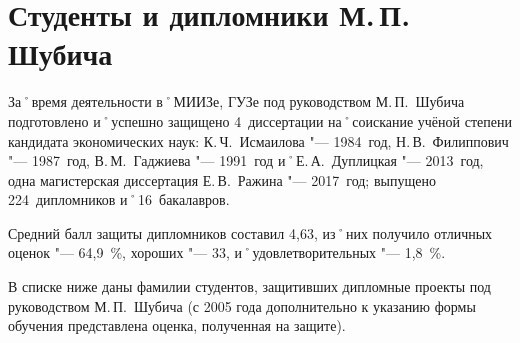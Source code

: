 ﻿\section{Студенты и дипломники М.\,П. Шубича}
За˚время деятельности в˚МИИЗе, ГУЗе под руководством М.\,П.~Шубича подготовлено и˚успешно защищено 4~диссертации на˚соискание учёной степени кандидата экономических наук: К.\,Ч.~Исмаилова "--- 1984~год, Н.\,В.~Филиппович "--- 1987~год, В.\,М.~Гаджиева "--- 1991~год и˚Е.\,А.~Дуплицкая "--- 2013~год, одна магистерская диссертация Е.\,В.~Ражина "--- 2017~год; выпущено 224~дипломников и˚16~бакалавров.

Средний балл защиты дипломников составил 4,63, из˚них получило отличных оценок "--- 64,9~\%, хороших "--- 33, и˚удовлетворительных "--- 1,8~\%.

В списке ниже даны фамилии студентов, защитивших дипломные проекты под руководством М.\,П.~Шубича (с 2005 года дополнительно к указанию формы обучения представлена  оценка, полученная на защите).

